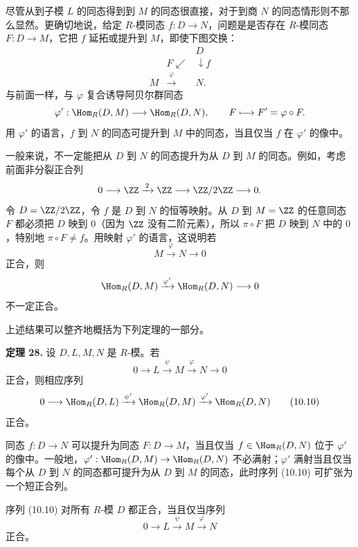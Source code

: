 尽管从到子模 $L$ 的同态得到到 $M$ 的同态很直接，对于到商 $N$ 的同态情形则不那么显然。更确切地说，给定 $R$-模同态 $f:D\to N$，问题是是否存在 $R$-模同态 $F:D\to M$，它把 $f$ 延拓或提升到 $M$，即使下图交换：
\[
\begin{array}{ccc}
&&D\\
&F\swarrow&\downarrow f\\[-1mm]
M&\xrightarrow{\varphi}&N.
\end{array}
\]
与前面一样，与 $\varphi$ 复合诱导阿贝尔群同态
\[
\varphi':\Hom_R(D,M)\longrightarrow\Hom_R(D,N),
\qquad F\longmapsto F'=\varphi\circ F.
\]
用 $\varphi'$ 的语言，$f$ 到 $N$ 的同态可提升到 $M$ 中的同态，当且仅当 $f$ 在 $\varphi'$ 的像中。

一般来说，不一定能把从 $D$ 到 $N$ 的同态提升为从 $D$ 到 $M$ 的同态。例如，考虑前面非分裂正合列
\[
0\longrightarrow\ZZ\xrightarrow{\,2\,}\ZZ\longrightarrow\ZZ/2\ZZ\longrightarrow0.
\]
令 $D=\ZZ/2\ZZ$，令 $f$ 是 $D$ 到 $N$ 的恒等映射。从 $D$ 到 $M=\ZZ$ 的任意同态 $F$ 都必须把 $D$ 映到 $0$（因为 $\ZZ$ 没有二阶元素），所以 $\pi\circ F$ 把 $D$ 映到 $N$ 中的 $0$，特别地 $\pi\circ F\neq f$。用映射 $\varphi'$ 的语言，这说明若
\[
M\xrightarrow{\varphi}N\longrightarrow0
\]
正合，则
\[
\Hom_R(D,M)\xrightarrow{\varphi'}\Hom_R(D,N)\longrightarrow0
\]
不一定正合。

上述结果可以整齐地概括为下列定理的一部分。

\noindent\textbf{定理 28.} 设 $D,L,M,N$ 是 $R$-模。若
\[
0\longrightarrow L\xrightarrow{\psi}M\xrightarrow{\varphi}N\longrightarrow0
\]
正合，则相应序列
\[
0\longrightarrow \Hom_R(D,L)\xrightarrow{\psi'}\Hom_R(D,M)\xrightarrow{\varphi'}\Hom_R(D,N)
\tag{10.10}
\]
正合。

同态 $f:D\to N$ 可以提升为同态 $F:D\to M$，当且仅当 $f\in\Hom_R(D,N)$ 位于 $\varphi'$ 的像中。一般地，$\varphi':\Hom_R(D,M)\to\Hom_R(D,N)$ 不必满射；$\varphi'$ 满射当且仅当每个从 $D$ 到 $N$ 的同态都可提升为从 $D$ 到 $M$ 的同态，此时序列 (10.10) 可扩张为一个短正合列。

序列 (10.10) 对所有 $R$-模 $D$ 都正合，当且仅当序列
\[
0\longrightarrow L\xrightarrow{\psi}M\xrightarrow{\varphi}N
\]
正合。

